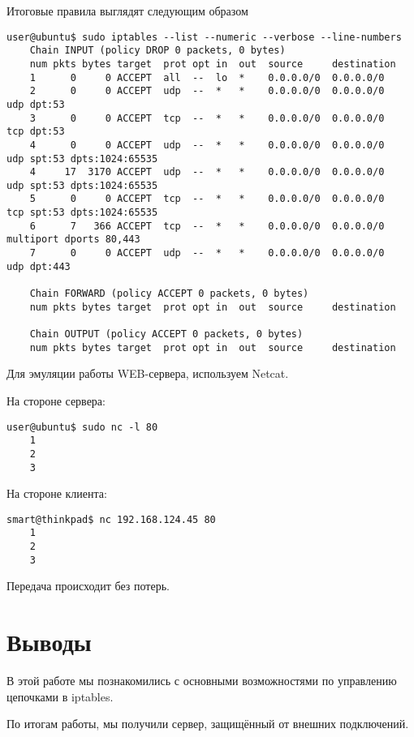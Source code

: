 Итоговые правила выглядят следующим образом
\begin{Verbatim}[frame=single]
    user@ubuntu$ sudo iptables --list --numeric --verbose --line-numbers
    Chain INPUT (policy DROP 0 packets, 0 bytes)
    num pkts bytes target  prot opt in  out  source     destination
    1      0     0 ACCEPT  all  --  lo  *    0.0.0.0/0  0.0.0.0/0  
    2      0     0 ACCEPT  udp  --  *   *    0.0.0.0/0  0.0.0.0/0   udp dpt:53
    3      0     0 ACCEPT  tcp  --  *   *    0.0.0.0/0  0.0.0.0/0   tcp dpt:53
    4      0     0 ACCEPT  udp  --  *   *    0.0.0.0/0  0.0.0.0/0   udp spt:53 dpts:1024:65535
    4     17  3170 ACCEPT  udp  --  *   *    0.0.0.0/0  0.0.0.0/0   udp spt:53 dpts:1024:65535
    5      0     0 ACCEPT  tcp  --  *   *    0.0.0.0/0  0.0.0.0/0   tcp spt:53 dpts:1024:65535
    6      7   366 ACCEPT  tcp  --  *   *    0.0.0.0/0  0.0.0.0/0   multiport dports 80,443
    7      0     0 ACCEPT  udp  --  *   *    0.0.0.0/0  0.0.0.0/0   udp dpt:443

    Chain FORWARD (policy ACCEPT 0 packets, 0 bytes)
    num pkts bytes target  prot opt in  out  source     destination

    Chain OUTPUT (policy ACCEPT 0 packets, 0 bytes)
    num pkts bytes target  prot opt in  out  source     destination
\end{Verbatim}

Для эмуляции работы WEB-сервера, используем Netcat.

На стороне сервера:
\begin{Verbatim}[frame=single]
    user@ubuntu$ sudo nc -l 80
    1
    2
    3
\end{Verbatim}

На стороне клиента:
\begin{Verbatim}[frame=single]
    smart@thinkpad$ nc 192.168.124.45 80
    1
    2
    3
\end{Verbatim}

Передача происходит без потерь.

\section*{Выводы}

В этой работе мы познакомились с основными возможностями по управлению цепочками в iptables.

По итогам работы, мы получили сервер, защищённый от внешних подключений.

